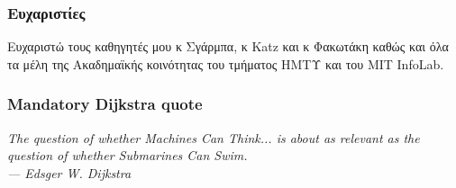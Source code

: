 \documentclass[bigger]{beamer}
\begin{document}
\begin{frame}
  \frametitle{Ευχαριστίες}

  Ευχαριστώ τους καθηγητές μου κ Σγάρμπα, κ Katz και κ Φακωτάκη καθώς
  και όλα τα μέλη της Ακαδημαϊκής κοινότητας του τμήματος ΗΜΤΥ και του
  MIT InfoLab.

\end{frame}

\begin{frame}
  \frametitle{Mandatory Dijkstra quote}

  \vfill
  \textit{The question of whether Machines Can Think... is about as relevant as the question of whether Submarines Can Swim.\\
  \hfill --- Edsger W. Dijkstra}
  \vfill

\end{frame}
\end{document}
